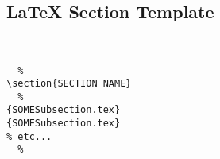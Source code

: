 %
%
%
%
% 
\subsection{\LaTeX{} Section Template}

\begin{verbatim}


  %
\section{SECTION NAME}
  %
{SOMESubsection.tex}
{SOMESubsection.tex}
% etc...
  %


\end{verbatim}


